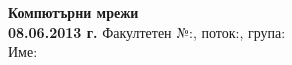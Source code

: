 \documentclass[9pt,addpoints,twoside]{exam}
\begin{document}
\pagestyle{headandfoot}
\firstpageheader
  {\large\bfseries Компютърни мрежи\\08.06.2013 г.}
  {}
  {Факултетен №:\enspace\makebox[2cm]{\dotfill},
    поток:\enspace\makebox[1cm]{\dotfill},
    група:\enspace\makebox[1cm]{\dotfill}\\
    Име:\enspace\makebox[8.4cm]{\dotfill}}




\cleardoublepage


\end{document}
